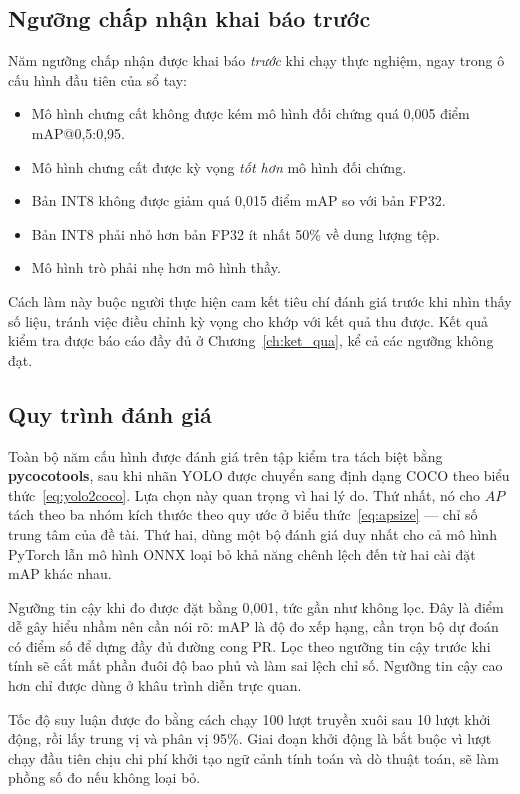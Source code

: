 \subsection{Ngưỡng chấp nhận khai báo trước}
\label{sec:nguong_chap_nhan}

Năm ngưỡng chấp nhận được khai báo \emph{trước} khi chạy thực nghiệm, ngay trong ô cấu hình đầu
tiên của sổ tay:

\begin{itemize}[leftmargin=1.5cm]
\item Mô hình chưng cất không được kém mô hình đối chứng quá 0,005 điểm mAP@0,5:0,95.
\item Mô hình chưng cất được kỳ vọng \emph{tốt hơn} mô hình đối chứng.
\item Bản INT8 không được giảm quá 0,015 điểm mAP so với bản FP32.
\item Bản INT8 phải nhỏ hơn bản FP32 ít nhất 50\% về dung lượng tệp.
\item Mô hình trò phải nhẹ hơn mô hình thầy.
\end{itemize}

Cách làm này buộc người thực hiện cam kết tiêu chí đánh giá trước khi nhìn thấy số liệu, tránh việc
điều chỉnh kỳ vọng cho khớp với kết quả thu được. Kết quả kiểm tra được báo cáo đầy đủ ở
Chương~\ref{ch:ket_qua}, kể cả các ngưỡng không đạt.

\subsection{Quy trình đánh giá}

Toàn bộ năm cấu hình được đánh giá trên tập kiểm tra tách biệt bằng \textbf{pycocotools}, sau khi
nhãn YOLO được chuyển sang định dạng COCO theo biểu thức~\eqref{eq:yolo2coco}. Lựa chọn này quan
trọng vì hai lý do. Thứ nhất, nó cho $AP$ tách theo ba nhóm kích thước theo quy ước ở
biểu thức~\eqref{eq:apsize} --- chỉ số trung tâm của đề tài. Thứ hai, dùng một bộ đánh giá duy nhất
cho cả mô hình PyTorch lẫn mô hình ONNX loại bỏ khả năng chênh lệch đến từ hai cài đặt mAP khác
nhau.

Ngưỡng tin cậy khi đo được đặt bằng 0,001, tức gần như không lọc. Đây là điểm dễ gây hiểu nhầm nên
cần nói rõ: mAP là độ đo xếp hạng, cần trọn bộ dự đoán có điểm số để dựng đầy đủ đường cong PR. Lọc
theo ngưỡng tin cậy trước khi tính sẽ cắt mất phần đuôi độ bao phủ và làm sai lệch chỉ số. Ngưỡng
tin cậy cao hơn chỉ được dùng ở khâu trình diễn trực quan.

Tốc độ suy luận được đo bằng cách chạy 100 lượt truyền xuôi sau 10 lượt khởi động, rồi lấy trung vị
và phân vị 95\%. Giai đoạn khởi động là bắt buộc vì lượt chạy đầu tiên chịu chi phí khởi tạo ngữ
cảnh tính toán và dò thuật toán, sẽ làm phồng số đo nếu không loại bỏ.


